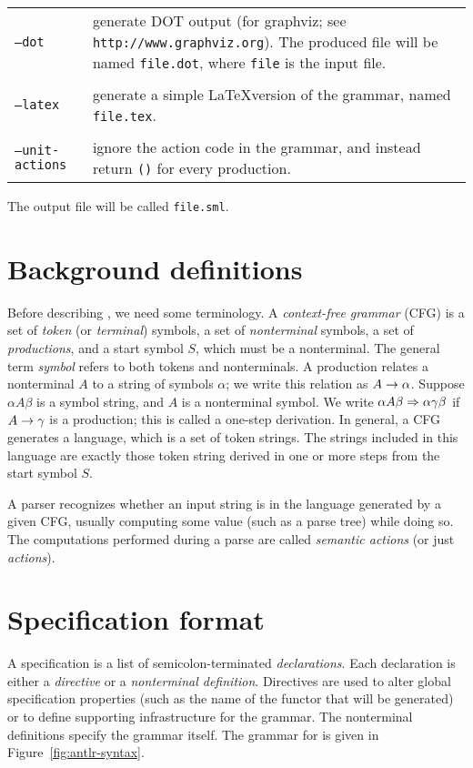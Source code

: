 \vskip 12pt
\begin{tabular}{lp{}}
  {\tt --dot} & generate DOT output (for graphviz; see \texttt{http://www.graphviz.org}).  The produced file will be named {\tt file.dot}, where {\tt file} is the input file. \\
  \\
  {\tt --latex} & generate a simple \LaTeX version of the grammar, named {\tt file.tex}. \\
  \\
  {\tt --unit-actions} & ignore the action code in the grammar, and instead return {\tt ()} for every production.
\end{tabular}

\vskip 10pt \noindent
The output file will be called {\tt file.sml}.

\section{Background definitions}

Before describing \antlr{}, we need some terminology.  A \emph{context-free grammar} (CFG) is a set of \emph{token} (or \emph{terminal}) symbols, a set of \emph{nonterminal} symbols, a set of \emph{productions}, and a start symbol $S$, which must be a nonterminal.  
The general term \emph{symbol} refers to both tokens and nonterminals.  A production relates a nonterminal $A$ to a string of symbols $\alpha$; we write this relation as $A \rightarrow \alpha$.  Suppose $\alpha A \beta$ is a symbol string, and $A$ is a nonterminal symbol.  We write $\alpha A \beta \Rightarrow \alpha \gamma \beta$ if $A \rightarrow \gamma$ is a production; this is called a one-step derivation.  In general, a CFG generates a language, which is a set of token strings.  The strings included in this language are exactly those token string derived in one or more steps from the start symbol $S$.

A parser recognizes whether an input string is in the language generated by a given CFG, usually computing some value (such as a parse tree) while doing so.  The computations performed during a parse are called \emph{semantic actions} (or just \emph{actions}).

\section{Specification format}\label{sec:antlr-spec}

A \antlr{} specification is a list of semicolon-terminated \emph{declarations}.  Each declaration is either a \emph{directive} or a \emph{nonterminal definition}.  Directives are used to alter global specification properties (such as the name of the functor that will be generated) or to define supporting infrastructure for the grammar.  The nonterminal definitions specify the grammar itself.  The grammar for \antlr{} is given in Figure~\ref{fig:antlr-syntax}.

